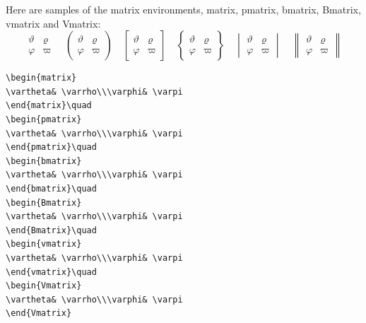 \documentclass[manuscript, printscheme]{aomart}
\newcommand{\ntt}{\normalfont\ttfamily}
\newcommand{\cn}[1]{{\protect\ntt\bslash#1}}
\newtheorem[{}\it]{thm}{Theorem}[section]
\theoremstyle{definition}
\newtheorem*[{}\it]{notation}{Notation}
\begin{document}
Here are samples of the matrix environments,
\cn{matrix}, \cn{pmatrix}, \cn{bmatrix}, \cn{Bmatrix}, \cn{vmatrix}
and \cn{Vmatrix}:
\begin{equation}
\begin{matrix}
\vartheta& \varrho\\\varphi& \varpi
\end{matrix}\quad
\begin{pmatrix}
\vartheta& \varrho\\\varphi& \varpi
\end{pmatrix}\quad
\begin{bmatrix}
\vartheta& \varrho\\\varphi& \varpi
\end{bmatrix}\quad
\begin{Bmatrix}
\vartheta& \varrho\\\varphi& \varpi
\end{Bmatrix}\quad
\begin{vmatrix}
\vartheta& \varrho\\\varphi& \varpi
\end{vmatrix}\quad
\begin{Vmatrix}
\vartheta& \varrho\\\varphi& \varpi
\end{Vmatrix}
\end{equation}
%
\begin{verbatim}
\begin{matrix}
\vartheta& \varrho\\\varphi& \varpi
\end{matrix}\quad
\begin{pmatrix}
\vartheta& \varrho\\\varphi& \varpi
\end{pmatrix}\quad
\begin{bmatrix}
\vartheta& \varrho\\\varphi& \varpi
\end{bmatrix}\quad
\begin{Bmatrix}
\vartheta& \varrho\\\varphi& \varpi
\end{Bmatrix}\quad
\begin{vmatrix}
\vartheta& \varrho\\\varphi& \varpi
\end{vmatrix}\quad
\begin{Vmatrix}
\vartheta& \varrho\\\varphi& \varpi
\end{Vmatrix}
\end{verbatim}
\end{document}
